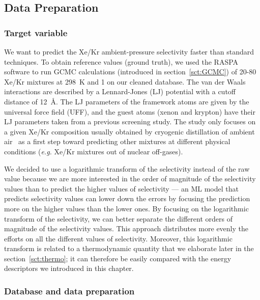 \documentclass[main]{subfiles}
\begin{document}
\subsection{Data Preparation}


\subsubsection{Target variable}

We want to predict the Xe/Kr ambient-pressure selectivity faster than standard techniques. To obtain reference values (ground truth), we used the RASPA software\autocite{dubbeldam2016} to run GCMC calculations (introduced in section~\ref{sct:GCMC}) of 20-80 Xe/Kr mixtures at \SI{298}{\kelvin} and \SI{1}{\atm} on our cleaned database. The van der Waals interactions are described by a Lennard-Jones (LJ) potential with a cutoff distance of \SI{12}{\angstrom}. The LJ parameters of the framework atoms are given by the universal force field (UFF),\autocite{rappe1992} and the guest atoms (xenon and krypton) have their LJ parameters taken from a previous screening study.\autocite{Ryan_2010} The study only focuses on a given Xe/Kr composition usually obtained by cryogenic distillation of ambient air~\autocite{kerry2007industrial} as a first step toward predicting other mixtures at different physical conditions (\emph{e.g.} Xe/Kr mixtures out of nuclear off-gases). 

We decided to use a logarithmic transform of the selectivity instead of the raw value because we are more interested in the order of magnitude of the selectivity values than to predict the higher values of selectivity --- an ML model that predicts selectivity values can lower down the errors by focusing the prediction more on the higher values than the lower ones. By focusing on the logarithmic transform of the selectivity, we can better separate the different orders of magnitude of the selectivity values. This approach distributes more evenly the efforts on all the different values of selectivity. Moreover, this logarithmic transform is related to a thermodynamic quantity that we elaborate later in the section~\ref{sct:thermo}; it can therefore be easily compared with the energy descriptors we introduced in this chapter.

\subsubsection{Database and data preparation}
\end{document}

